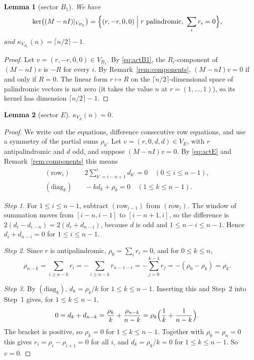 \documentclass[11pt]{amsart}
\theoremstyle{plain}
\newtheorem{lemma}{Lemma}
\theoremstyle{definition}
\theoremstyle{remark}
\numberwithin{equation}{section}
\newcommand{\VBa}{V_{B_1}}
\newcommand{\VE}{V_{E}}
\begin{document}
\begin{lemma}[sector \(B_1\)]\label{lem:B1}
We have
\[
\ker\bigl((M-nI)|_{\VBa}\bigr)=\Bigl\{(r,-r,0,0)\Bigm| r\text{ palindromic},\ \sum_ir_i=0\Bigr\},
\]
and \(\kappa_{\VBa}(n)=\lceil n/2\rceil-1\).
\end{lemma}

\begin{proof}
Let \(v=(r,-r,0,0)\in\VBa\). By \eqref{eq:actB1}, the \(R_i\)-component of \((M-nI)v\) is
\(-R\) for every \(i\). By Remark~\ref{rem:components}, \((M-nI)v=0\) if and only if
\(R=0\). The linear form \(r\mapsto R\) on the \(\lceil n/2\rceil\)-dimensional space of
palindromic vectors is not zero (it takes the value \(n\) at \(r=(1,\dots,1)\)), so its
kernel has dimension \(\lceil n/2\rceil-1\).
\end{proof}

\begin{lemma}[sector \(E\)]\label{lem:E}
\(\kappa_{\VE}(n)=0\).
\end{lemma}

\begin{proof}
We write out the equations, difference consecutive row equations, and use a symmetry of
the partial sums \(\rho_k\). Let \(v=(r,0,d,d)\in\VE\), with \(r\) antipalindromic and
\(d\) odd, and suppose \((M-nI)v=0\). By \eqref{eq:actE} and
Remark~\ref{rem:components} this means
\begin{align*}
(\mathrm{row}_i)&\quad 2\sum_{k'=i-n+1}^{i}d_{k'}=0\quad(0\le i\le n-1),\\
(\mathrm{diag}_k)&\quad -kd_k+\rho_k=0\quad(1\le k\le n-1).
\end{align*}

\emph{Step 1.} For \(1\le i\le n-1\), subtract \((\mathrm{row}_{i-1})\) from
\((\mathrm{row}_i)\). The window of summation moves from \([i-n,i-1]\) to
\([i-n+1,i]\), so the difference is \(2(d_i-d_{i-n})=2(d_i+d_{n-i})\), because \(d\) is
odd and \(1\le n-i\le n-1\). Hence \(d_i+d_{n-i}=0\) for \(1\le i\le n-1\).

\emph{Step 2.} Since \(r\) is antipalindromic, \(\rho_0=\sum_ir_i=0\), and for
\(0\le k\le n\),
\[
\rho_{n-k}=\sum_{i\ge n-k}r_i=-\sum_{i\ge n-k}r_{n-1-i}=-\sum_{j=0}^{k-1}r_j
=-(\rho_0-\rho_k)=\rho_k.
\]

\emph{Step 3.} By \((\mathrm{diag}_k)\), \(d_k=\rho_k/k\) for \(1\le k\le n-1\).
Inserting this and Step~2 into Step~1 gives, for \(1\le k\le n-1\),
\[
0=d_k+d_{n-k}=\frac{\rho_k}{k}+\frac{\rho_{n-k}}{n-k}
=\rho_k\Bigl(\frac1k+\frac1{n-k}\Bigr).
\]
The bracket is positive, so \(\rho_k=0\) for \(1\le k\le n-1\). Together with
\(\rho_0=\rho_n=0\) this gives \(r_i=\rho_i-\rho_{i+1}=0\) for all \(i\), and
\(d_k=\rho_k/k=0\) for \(1\le k\le n-1\). So \(v=0\).
\end{proof}
\end{document}
